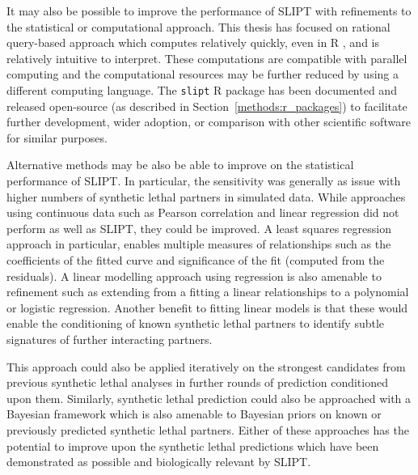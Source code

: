 It may also be possible to improve the performance of \gls{SLIPT} with refinements to the statistical or computational approach. This thesis has focused on rational query-based approach which computes relatively quickly, even in R \citep{R_core}, and is relatively intuitive to interpret. These computations are compatible with parallel computing and the computational resources may be further reduced by using a different computing language. The \texttt{slipt} R package has been documented and released open-source (as described in Section~\ref{methods:r_packages}) to facilitate further development, wider adoption, or comparison with other scientific software for similar purposes. 

Alternative methods may be also be able to improve on the statistical performance of \gls{SLIPT}. In particular, the sensitivity was generally as issue with higher numbers of \gls{synthetic lethal} partners in simulated data. While approaches using continuous data such as Pearson correlation and linear regression did not perform as well as \gls{SLIPT}, they could be improved. A least squares regression approach in particular, enables multiple measures of relationships such as the coefficients of the fitted curve and significance of the fit (computed from the residuals). A linear modelling approach using regression is also amenable to refinement such as extending from a fitting a linear relationships to a polynomial or logistic regression. Another benefit to fitting linear models is that these would enable the conditioning of known \gls{synthetic lethal} partners to identify subtle signatures of further interacting partners.

This approach could also be applied iteratively on the strongest candidates from previous \gls{synthetic lethal} analyses in further rounds of prediction conditioned upon them. Similarly, \gls{synthetic lethal} prediction could also be approached with a Bayesian framework which is also amenable to Bayesian priors on known or previously predicted \gls{synthetic lethal} partners. Either of these approaches has the potential to improve upon the \gls{synthetic lethal} predictions which have been demonstrated as possible and biologically relevant by \gls{SLIPT}. 